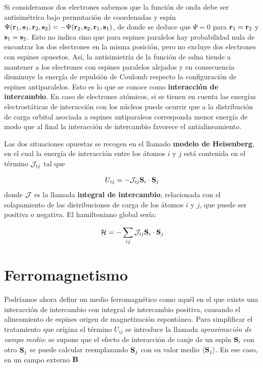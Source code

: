 Si consideramos dos electrones sabemos que la función de onda debe ser antisimétrica bajo permutación de coordenadas y espín $\Psi(\mathbf{r}_1,\mathbf{s}_1,\mathbf{r}_2,\mathbf{s}_2) = -\Psi(\mathbf{r}_2,\mathbf{s}_2,\mathbf{r}_1,\mathbf{s}_1)$, de donde se deduce que $\Psi=0$ para $\mathbf{r}_1 = \mathbf{r}_2$ y $\mathbf{s}_1=\mathbf{s}_2$. Esto no indica sino que para espines paralelos hay probabilidad nula de encontrar los dos electrones en la misma posición, pero no excluye dos electrones con espines opuestos. Así, la antisimietría de la función de odna tiende a mantener a los electrones con espines paralelos alejados y en consecuencia disminuye la energía de repulsión de Coulomb respecto la configuración de espines antiparalelos. Esto es lo que se conoce como \textbf{interacción de intercambio}. En caso de electrones atómicos, si se tienen en cuenta las energías electrostáticas de interacción con los núcleos puede ocurrir que a la distribución de carga orbital asociada a espines antiparaleos corresponda menor energía de modo que al final la interacción de intercambio favorece el antialineamiento.

Las dos situaciones opuestas se recogen en el llamado \textbf{modelo de Heisenberg}, en el cual la energía de interacción entre los átomos $i$ y $j$ está contenida en el término $\mathcal{J}_{ij}$ tal que 

\begin{equation}
	U_{ij} = - \mathcal{J}_{ij} \mathbf{S}_i \cdot \mathbf{S}_j
\end{equation}
donde $\mathcal{J}$ es la llamada \textbf{integral de intercambio}, relacionada con el solapamiento de las distribuciones de carga de los átomos $i$ y $j$, que puede ser positiva o negativa. El hamiltoniano global sería:

\begin{equation}
	\mathcal{H} = - \sum_{ij} \mathcal{J}_{ij} \mathbf{S}_i \cdot \mathbf{S}_j
\end{equation}

\section{Ferromagnetismo}

Podríamos ahora definr un medio ferromagnético como aquél en el que existe una interacción de intercambio con integral de intercambio positiva, causando el alineamiento de espines origen de magnetización espontánea. Para simplificar el tratamiento que origina el término $U_{ij}$ se introduce la llamada \textit{aproximación de campo medio}: se supone que el efecto de interacción de canje de un espín $\mathbf{S}_i$ con otro $\mathbf{S}_j$ se puede calcular reemplazando $\mathbf{S}_j$ con su valor medio $\langle \mathbf{S}_j \rangle$. En ese caso, en un campo externo $\mathbf{B}$

